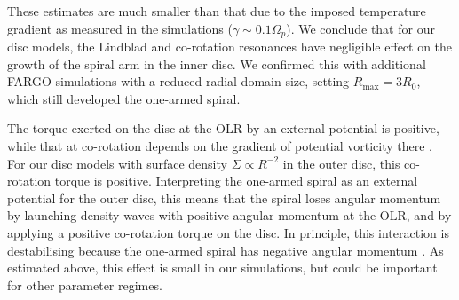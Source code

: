 These estimates are much smaller than that due to
the imposed temperature gradient as measured in the simulations
($\gamma\sim 0.1\Omega_p$). We conclude that for our disc models, the
Lindblad and co-rotation resonances have negligible effect on the
growth of the spiral arm in the inner disc. We confirmed this with
additional FARGO simulations with a reduced radial domain size,
setting $R_\mathrm{max}=3R_0$, which still developed the one-armed
spiral. 

The torque exerted on the disc at the OLR by an
external potential is positive, while that at co-rotation 
depends on the gradient of potential vorticity there
\citep{goldreich79}. For our disc models with surface density
$\Sigma\propto R^{-2}$ in the outer disc, this co-rotation torque is
positive. Interpreting the one-armed spiral as an external potential
for the outer disc, this means that the spiral loses
angular momentum by launching density waves with positive angular momentum at
the OLR, and by applying a positive co-rotation torque on the disc. In
principle, this interaction is destabilising because the one-armed
spiral has negative angular momentum \citep{lin11b}. As estimated
above, this effect is small in our simulations, but could be
important for other parameter regimes. 

